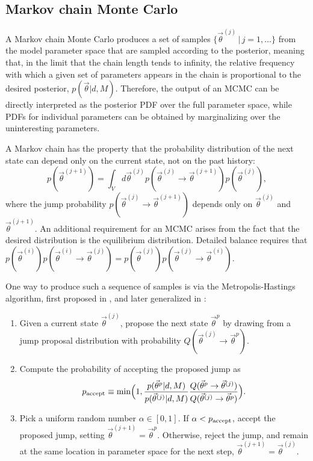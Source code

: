 \documentclass{rsos}
\newcommand{\vtheta}{\vec{\theta}}
\newcommand{\be}{\begin{equation}}
\newcommand{\ee}{\end{equation}}
\newcommand{\bel}[1]{\begin{equation}\label{#1}}
\begin{document}
\subsection{Markov chain Monte Carlo} \label{sec:mcmc}

A Markov chain Monte Carlo \cite{Gilks:1996} produces a set of samples
$\{ \vtheta^{(j)} \, | \, j = 1, \ldots \}$ from the model parameter
space that are sampled according to the posterior, meaning that, in
the limit that the chain length tends to infinity, the relative
frequency with which a given set of parameters appears in the chain is
proportional to the desired posterior, $p(\vtheta|d,M)$.  Therefore,
the output of an MCMC can be directly interpreted as the posterior PDF
over the full parameter space, while PDFs for individual parameters
can be obtained by marginalizing over the uninteresting parameters.

A Markov chain has the property that the probability distribution of
the next state can depend only on the current state, not on the past
history: 
%
\be 
p(\vtheta^{(j+1)})=\int_{V} d\vtheta^{(j)} p(\vtheta^{(j)} \to
\vtheta^{(j+1)}) p(\vtheta^{(j)}), \ee
%
where the jump probability $p(\vtheta^{(j)} \to \vtheta^{(j+1)})$
depends only on $\vtheta^{(j)}$ and $\vtheta^{(j+1)}$.  An additional
requirement for an MCMC arises from the fact that the desired
distribution is the equilibrium distribution.  Detailed balance requires that
$p(\vtheta^{(i)}) p(\vtheta^{(i)} \to \vtheta^{(j)}) = p(\vtheta^{(j)}) p(\vtheta^{(j)} \to \vtheta^{(i)})$.


One way to produce such a sequence of samples is via the
Metropolis-Hastings algorithm, first proposed in
\cite{Metropolis:1953}, and later generalized in
\cite{Hastings:1970}:
\begin{enumerate}
\item Given a current state $\vtheta^{(j)}$, propose the next state
  $\vtheta^p$ by drawing from a jump proposal distribution with
  probability $Q(\vtheta^{(j)} \to \vtheta^p)$.
\item Compute the probability of accepting the proposed jump as
  \bel{eq:p-accept} 
p_{\textnormal{accept}} \equiv \min\Bigl(1,
\frac{p(\vtheta^p|d, M)}{p(\vtheta^{(j)}|d, M)} \frac{Q(\vtheta^p \to
  \vtheta^{(j)})}{Q(\vtheta^{(j)} \to \vtheta^p)} \Bigr).  
\ee
\item Pick a uniform random number $\alpha \in [0,1]$.  If $\alpha<
  p_{\textnormal{accept}}$, accept the proposed jump, setting
  $\vtheta^{(j+1)}=\vtheta^p$.  Otherwise, reject the jump, and remain
  at the same location in parameter space for the next step,
  $\vtheta^{(j+1)}=\vtheta^{(j)}$.
\end{enumerate}
 
\end{document}
